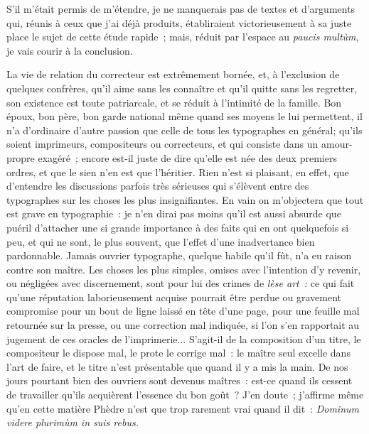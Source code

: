 \documentclass[french,twoside]{book} %
\begin{document}
S’il m’était permis de m’étendre, je ne manquerais pas de textes et d’arguments qui, réunis à ceux que j’ai déjà produits, établiraient victorieusement à sa juste place le sujet de cette étude rapide ; mais, réduit par l’espace au \emph{paucis multùm}, je vais courir à la conclusion.\par
La vie de relation du correcteur est extrêmement bornée, et, à l’exclusion de quelques confrères, qu’il aime sans les connaître et qu’il quitte sans les regretter, son existence est toute patriarcale, et se réduit à l’intimité de la famille. Bon époux, bon père, bon garde national même quand ses moyens le lui permettent, il n’a d’ordinaire d’autre passion que celle de tous les typographes en  général; qu’ils soient imprimeurs, compositeurs ou correcteurs, et qui consiste dans un amour-propre exagéré ; encore est-il juste de dire qu’elle est née des deux premiers ordres, et que le sien n’en est que l’héritier. Rien n’est si plaisant, en effet, que d’entendre les discussions parfois très sérieuses qui s’élèvent entre des typographes sur les choses les plus insignifiantes. En vain on m’objectera que tout est grave en typographie : je n’en dirai pas moins qu’il est aussi absurde que puéril d’attacher une si grande importance à des faits qui en ont quelquefois si peu, et qui ne sont, le plus souvent, que l’effet d’une inadvertance bien pardonnable. Jamais ouvrier typographe, quelque habile qu’il fût, n’a eu raison contre son maître. Les choses les plus simples, omises avec l’intention d’y revenir, ou négligées avec discernement, sont pour lui des crimes de \emph{lèse art :} ce qui fait qu’une réputation  laborieusement acquise pourrait être perdue ou gravement compromise pour un bout de ligne laissé en tête d’une page, pour une feuille mal retournée sur la presse, ou une correction mal indiquée, si l’on s’en rapportait au jugement de ces oracles de l’imprimerie... S’agit-il de la composition d’un titre, le compositeur le dispose mal, le prote le corrige mal : le maître seul excelle dans l’art de faire, et le titre n’est présentable que quand il y a mis la main. De nos jours pourtant bien des ouvriers sont devenus maîtres : est-ce quand ils cessent de travailler qu’ils acquièrent l’essence du bon goût ? J’en doute ; j’affirme même qu’en cette matière Phèdre n’est que trop rarement vrai quand il dit : \emph{Dominum videre plurimùm in suis rebus.}\par
\end{document}
